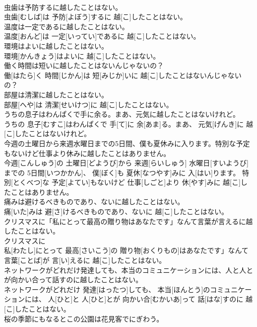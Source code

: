 \documentclass[8pt]{extreport}
\begin{document}
\begin{CJK}{UTF8}{min}
\\	虫歯は予防するに越したことはない。	
\\	虫歯[むしば]は 予防[よぼう]するに 越[こ]したことはない。
\\	温度は一定であるに越したことはない。	
\\	温度[おんど]は 一定[いってい]であるに 越[こ]したことはない。
\\	環境はよいに越したことはない。	
\\	環境[かんきょう]はよいに 越[こ]したことはない。
\\	働く時間は短いに越したことはないんじゃないの？	
\\	働[はたら]く 時間[じかん]は 短[みじか]いに 越[こ]したことはないんじゃないの？
\\	部屋は清潔に越したことはない。	
\\	部屋[へや]は 清潔[せいけつ]に 越[こ]したことはない。
\\	うちの息子はわんぱくで手に余る。まあ、元気に越したことはないけれど。	
\\	うちの 息子[むすこ]はわんぱくで 手[て]に 余[あま]る。まあ、 元気[げんき]に 越[こ]したことはないけれど。
\\	今週の土曜日から来週水曜日までの5日間、僕も夏休みに入ります。特別な予定もないけど仕事より休みに越したことはありません。	
\\	今週[こんしゅう]の 土曜日[どようび]から 来週[らいしゅう] 水曜日[すいようび]までの 5日間[いつかかん]、 僕[ぼく]も 夏休[なつやす]みに 入[はい]ります。 特別[とくべつ]な 予定[よてい]もないけど 仕事[しごと]より 休[やす]みに 越[こ]したことはありません。
\\	痛みは避けるべきものであり、ないに越したことはない。	
\\	痛[いた]みは 避[さ]けるべきものであり、ないに 越[こ]したことはない。
\\	クリスマスに「私にとって最高の贈り物はあなたです」なんて言葉が言えるに越したことはない。	
\\	クリスマスに
\\	私[わたし]にとって 最高[さいこう]の 贈り物[おくりもの]はあなたです」なんて 言葉[ことば]が 言[い]えるに 越[こ]したことはない。
\\	ネットワークがどれだけ発達しても、本当のコミュニケーションには、人と人とが向かい合って話すのに越したことはない。	
\\	ネットワークがどれだけ 発達[はったつ]しても、 本当[ほんとう]のコミュニケーションには、 人[ひと]と 人[ひと]とが 向かい合[むかいあ]って 話[はな]すのに 越[こ]したことはない。
\\	桜の季節にもなるとこの公園は花見客でにぎわう。	

\end{CJK}
\end{document}
